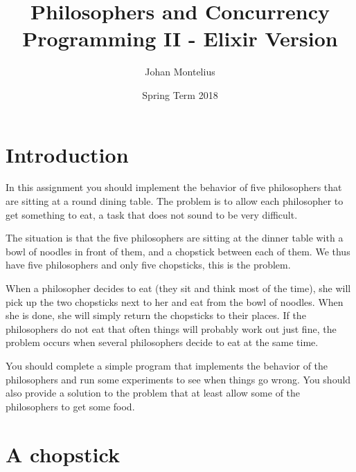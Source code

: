 \documentclass[a4paper,11pt]{article}
\begin{document}

\title{
    \textbf{Philosophers and Concurrency}\\
    \large{Programming II - Elixir Version}
}
\author{Johan Montelius}
\date{Spring Term 2018}
\maketitle
{}



\section*{Introduction}

In this assignment you should implement the behavior of five
philosophers that are sitting at a round dining table. The problem is to
allow each philosopher to get something to eat, a task that does not
sound to be very difficult. 

The situation is that the five philosophers are sitting at the dinner
table with a bowl of noodles in front of them, and a chopstick
between each of them. We thus have five philosophers and only five
chopsticks, this is the problem.

When a philosopher decides to eat (they sit and think most of the
time), she will pick up the two chopsticks next to her and eat from
the bowl of noodles. When she is done, she will simply return the
chopsticks to their places. If the philosophers do not eat that often
things will probably work out just fine, the problem occurs when
several philosophers decide to eat at the same time.

You should complete a simple program that implements the behavior
of the philosophers and run some experiments to see when things go
wrong. You should also provide a solution to the problem that at least
allow some of the philosophers to get some food.  



\section{A chopstick}
\end{document}
